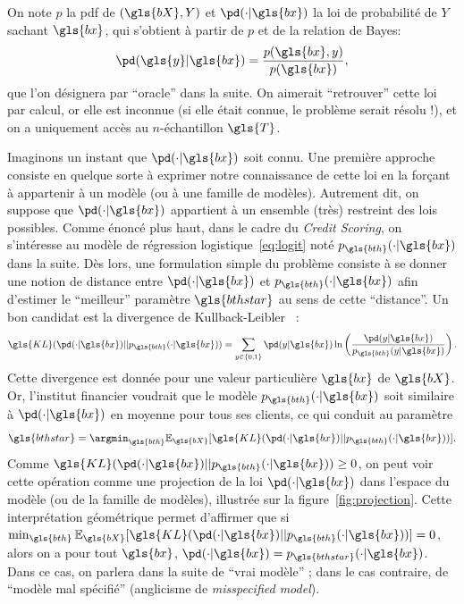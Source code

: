 On note $p$ la \gls{pdf} de $(\gls{bX},Y)$ et $\pd(\cdot | \gls{bx})$ la loi de probabilité de $Y$ sachant $\gls{bx}$, qui s'obtient à partir de $p$ et de la relation de Bayes: $$\pd(\gls{y} | \gls{bx}) = \frac{p(\gls{bx},y)}{p(\gls{bx})},$$ que l'on désignera par ``oracle'' dans la suite. On aimerait ``retrouver'' cette loi par calcul, or elle est inconnue (si elle était connue, le problème serait résolu !), et on a uniquement accès au $n$-échantillon $\gls{T}$.

Imaginons un instant que $\pd(\cdot | \gls{bx})$ soit connu. Une première approche consiste en quelque sorte à exprimer notre connaissance de cette loi en la forçant à appartenir à un modèle (ou à une famille de modèles). Autrement dit, on suppose que $\pd(\cdot | \gls{bx})$ appartient à un ensemble (très) restreint des lois possibles. 
Comme énoncé plus haut, dans le cadre du \textit{Credit Scoring}, on s'intéresse au modèle de régression logistique~\eqref{eq:logit} noté $p_{\gls{bth}}(\cdot | \gls{bx})$ dans la suite. Dès lors, une formulation simple du problème consiste à se donner une notion de distance entre $\pd(\cdot | \gls{bx})$ et $p_{\gls{bth}}(\cdot | \gls{bx})$ afin d'estimer le ``meilleur'' paramètre $\gls{bthstar}$ au sens de cette ``distance''. Un bon candidat est la divergence de Kullback-Leibler~\cite{kullback1951information} :
\begin{equation} \label{eq:KL}
\gls{KL}(\pd(\cdot | \gls{bx})||p_{\gls{bth}}(\cdot | \gls{bx})) = \sum_{y \in \{0,1\}} \pd(y | \gls{bx}) \ln \left( \frac{\pd(y | \gls{bx})}{p_{\gls{bth}}(y | \gls{bx})} \right).
\end{equation}
Cette divergence est donnée pour une valeur particulière $\gls{bx}$ de $\gls{bX}$. Or, l'institut financier voudrait que le modèle $p_{\gls{bth}}(\cdot | \gls{bx})$ soit similaire à $\pd(\cdot | \gls{bx})$ en moyenne pour tous ses clients, ce qui conduit au paramètre $${\gls{bthstar}} = \argmin_{\gls{bth}} \mathbb{E}_{\gls{bX}} [\gls{KL}(\pd(\cdot | \gls{bx})||p_{\gls{bth}}(\cdot | \gls{bx}))].$$ Comme $\gls{KL}(\pd(\cdot | \gls{bx})||p_{\gls{bth}}(\cdot | \gls{bx})) \geq 0$, on peut voir cette opération comme une projection de la loi $\pd(\cdot | \gls{bx})$ dans l'espace du modèle (ou de la famille de modèles), illustrée sur la figure~\ref{fig:projection}. Cette interprétation géométrique permet d'affirmer que si $\min_{\gls{bth}} \mathbb{E}_{\gls{bX}} [\gls{KL}(\pd(\cdot | \gls{bx})||p_{\gls{bth}}(\cdot | \gls{bx}))] = 0$, alors on a pour tout $\gls{bx}$, $\pd(\cdot | \gls{bx}) = p_{\gls{bthstar}}(\cdot | \gls{bx})$. Dans ce cas, on parlera dans la suite de ``vrai modèle'' ; dans le cas contraire, de ``modèle mal spécifié'' (anglicisme de \textit{misspecified model}).


